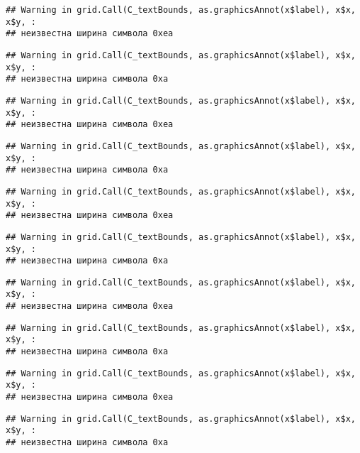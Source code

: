 \documentclass[
]{article}
\begin{document}
\begin{verbatim}
## Warning in grid.Call(C_textBounds, as.graphicsAnnot(x$label), x$x, x$y, :
## неизвестна ширина символа 0xea
\end{verbatim}

\begin{verbatim}
## Warning in grid.Call(C_textBounds, as.graphicsAnnot(x$label), x$x, x$y, :
## неизвестна ширина символа 0xa
\end{verbatim}

\begin{verbatim}
## Warning in grid.Call(C_textBounds, as.graphicsAnnot(x$label), x$x, x$y, :
## неизвестна ширина символа 0xea
\end{verbatim}

\begin{verbatim}
## Warning in grid.Call(C_textBounds, as.graphicsAnnot(x$label), x$x, x$y, :
## неизвестна ширина символа 0xa
\end{verbatim}

\begin{verbatim}
## Warning in grid.Call(C_textBounds, as.graphicsAnnot(x$label), x$x, x$y, :
## неизвестна ширина символа 0xea
\end{verbatim}

\begin{verbatim}
## Warning in grid.Call(C_textBounds, as.graphicsAnnot(x$label), x$x, x$y, :
## неизвестна ширина символа 0xa
\end{verbatim}

\begin{verbatim}
## Warning in grid.Call(C_textBounds, as.graphicsAnnot(x$label), x$x, x$y, :
## неизвестна ширина символа 0xea
\end{verbatim}

\begin{verbatim}
## Warning in grid.Call(C_textBounds, as.graphicsAnnot(x$label), x$x, x$y, :
## неизвестна ширина символа 0xa
\end{verbatim}

\begin{verbatim}
## Warning in grid.Call(C_textBounds, as.graphicsAnnot(x$label), x$x, x$y, :
## неизвестна ширина символа 0xea
\end{verbatim}

\begin{verbatim}
## Warning in grid.Call(C_textBounds, as.graphicsAnnot(x$label), x$x, x$y, :
## неизвестна ширина символа 0xa
\end{verbatim}
\end{document}
